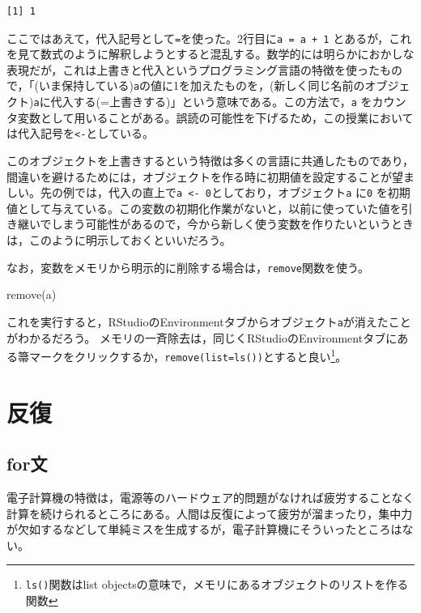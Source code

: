 \documentclass[
  a4paper,
]{ltjsbook}
\newenvironment{Shaded}{\begin{snugshade}}{\end{snugshade}}
\newcommand{\FunctionTok}[1]{\textcolor[rgb]{0.28,0.35,0.67}{#1}}
\newcommand{\NormalTok}[1]{\textcolor[rgb]{0.00,0.23,0.31}{#1}}
\begin{document}
\begin{verbatim}
[1] 1
\end{verbatim}

ここではあえて，代入記号として\texttt{=}を使った。2行目に\texttt{a\ =\ a\ +\ 1}
とあるが，これを見て数式のように解釈しようとすると混乱する。数学的には明らかにおかしな表現だが，これは上書きと代入というプログラミング言語の特徴を使ったもので，「(いま保持している)\texttt{a}の値に1を加えたものを，(新しく同じ名前のオブジェクト)\texttt{a}に代入する(=上書きする)」という意味である。この方法で，\texttt{a}
をカウンタ変数として用いることがある。誤読の可能性を下げるため，この授業においては代入記号を\texttt{\textless{}-}としている。

このオブジェクトを上書きするという特徴は多くの言語に共通したものであり，間違いを避けるためには，オブジェクトを作る時に初期値を設定することが望ましい。先の例では，代入の直上で\texttt{a\ \textless{}-\ 0}としており，オブジェクト\texttt{a}
に\texttt{0}
を初期値として与えている。この変数の初期化作業がないと，以前に使っていた値を引き継いでしまう可能性があるので，今から新しく使う変数を作りたいというときは，このように明示しておくといいだろう。

なお，変数をメモリから明示的に削除する場合は，\texttt{remove}関数を使う。

\begin{Shaded}
\begin{Highlighting}[]
\FunctionTok{remove}\NormalTok{(a)}
\end{Highlighting}
\end{Shaded}

これを実行すると，RStudioのEnvironmentタブからオブジェクト\texttt{a}が消えたことがわかるだろう。
メモリの一斉除去は，同じくRStudioのEnvironmentタブにある箒マークをクリックするか，\texttt{remove(list=ls())}とすると良い\footnote{\texttt{ls()}関数はlist
  objectsの意味で，メモリにあるオブジェクトのリストを作る関数}。

\section{反復}\label{ux53cdux5fa9}

\subsection{for文}\label{forux6587}

電子計算機の特徴は，電源等のハードウェア的問題がなければ疲労することなく計算を続けられるところにある。人間は反復によって疲労が溜まったり，集中力が欠如するなどして単純ミスを生成するが，電子計算機にそういったところはない。
\end{document}
